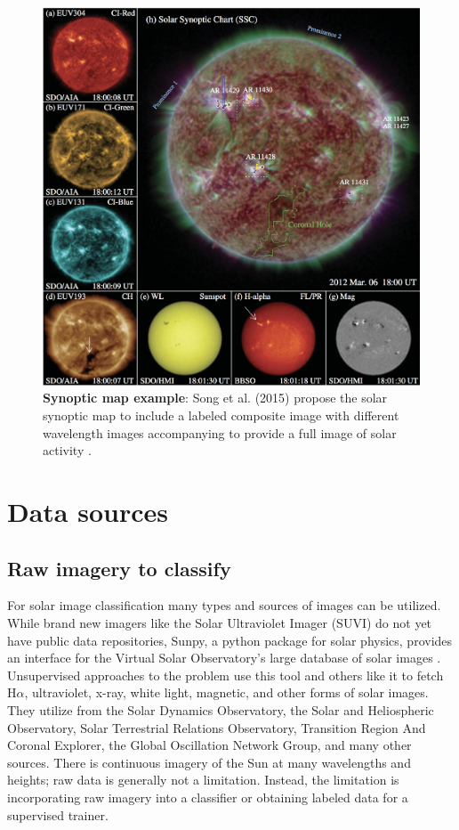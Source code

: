\documentclass[twoside]{report}
\begin{document}
\begin{figure}[ht]
  \begin{center}
    \includegraphics[scale=0.25]{ssc_example-song-2015.png}
    \caption{{\bf Synoptic map example}: Song et al. (2015) propose the solar synoptic map to include a labeled composite image with different wavelength images accompanying to provide a full image of solar activity \cite{song:2015}. }
    \label{fig:sccexample}
 \end{center}
\end{figure}

\section{Data sources}
\subsection{Raw imagery to classify} 
For solar image classification many types and sources of images can be utilized. While brand new imagers like the Solar Ultraviolet Imager (SUVI) do not yet have public data repositories, Sunpy, a python package for solar physics, provides an interface for the Virtual Solar Observatory's large database of solar images \cite{sunpy}. Unsupervised approaches to the problem use this tool and others like it to fetch H$\alpha$, ultraviolet, x-ray, white light, magnetic, and other forms of solar images. They utilize from the Solar Dynamics Observatory, the Solar and Heliospheric Observatory, Solar Terrestrial Relations Observatory, Transition Region And Coronal Explorer, the Global Oscillation Network Group, and many other sources. There is continuous imagery of the Sun at many wavelengths and heights; raw data is generally not a limitation. Instead, the limitation is incorporating raw imagery into a classifier or obtaining labeled data for a supervised trainer. 
\end{document}
